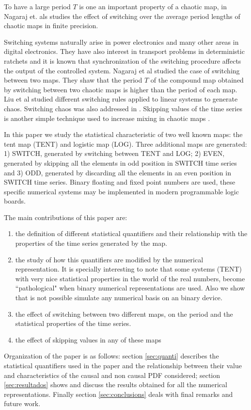 To have a large period $T$ is one an important property of a chaotic map, in \cite{Nagaraj2008} Nagaraj et. als studies the effect of switching over the average period lengths of chaotic maps in finite precision.

Switching systems naturally arise in power electronics and many other areas in digital electronics. They have also interest in transport problems in deterministic ratchets \cite{Zarlenga2009} and it is known that synchronization of the switching procedure affects the output of the controlled system. Nagaraj et al \cite{Nagaraj2008} studied the case of switching between two maps. They shaw that the period $T$ of the
compound map obtained by switching between two chaotic maps is higher than the period of each map. Liu et al \cite{Liu2006} studied different switching rules applied to linear systems to generate chaos. Switching chaos was also addressed in \cite{Gluskin2008}. Skipping values of the time series is another simple technique used to increase mixing in chaotic maps \cite{DeMicco2008}. 

In this paper we study the statistical characteristic of two well known maps: the tent map (TENT) and logistic map (LOG). Three additional maps are generated: 1) SWITCH, generated by switching between TENT and LOG; 2) EVEN, generated by skipping all the elements in odd position in SWITCH time series and 3) ODD, generated by discarding all the elements in an even position in SWITCH time series. Binary floating and fixed point numbers are used, these specific numerical systems may be implemented in modern programmable logic boards.

The main contributions of this paper are:
\begin{enumerate}
\item the definition of different statistical quantifiers and their relationship with the properties of the time series generated by the map. 
\item the study of how this quantifiers are modified by the numerical representation. It is specially interesting to note that some systems (TENT) with very nice statistical properties in the world of the real numbers, become ``pathological" when binary numerical representations are used. Also we show that is not possible simulate any numerical basis on an binary device.
\item the effect of switching between two different maps, on the period and the statistical properties of the time series. 
\item the effect of skipping values in any of these maps
\end{enumerate}

Organization of the paper is as follows: section \ref{sec:quanti} describes the statistical quantifiers used in the paper and the relationship between their value and characteristics of the causal and non causal PDF considered; section \ref{sec:resultados} shows and discuss the results obtained for all the numerical representations. Finally section \ref{sec:conclusions} deals with final remarks and future work. 